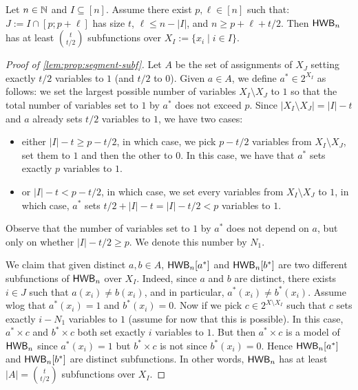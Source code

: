 \documentclass[a4paper,UKenglish,cleveref, autoref, thm-restate]{lipics-v2021}
\begin{document}
\begin{toappendix}
\begin{lemma}
	\label{lem:prop:segment-subf}
	Let $n \in \mathbb{N}$ and $I \subseteq [n]$. Assume there exist $p, \ell \in [n]$ such that:
		 $J := I \cap [p; p+\ell]$ has size $t$,
		 $\ell \leq n - |I|$, and
		 $n \geq p+\ell+t/2$.
	Then $\mathsf{HWB}_n$ has at least $t \choose t/2$ subfunctions over $X_I := \{x_i \mid i \in I\}$.
\end{lemma}
  \begin{proof}[Proof of \cref{lem:prop:segment-subf}]
	Let $A$ be the set of assignments of $X_J$ setting exactly $t/2$ variables to $1$ (and $t/2$ to $0$). Given $a \in A$, we define $a^* \in 2^{X_I}$  as follows: we set the largest possible number of variables $X_I \setminus X_J$ to $1$ so that the total number of variables set to $1$ by $a^*$ does not exceed $p$. Since $|X_I \setminus X_J| = |I|-t$ and $a$ already sets $t/2$ variables to $1$, we have two cases:
	\begin{itemize}
		\item either $|I|-t \geq p-t/2$, in which case, we pick $p-t/2$ variables from $X_I \setminus X_J$, set them to $1$ and then the other to $0$. In this case, we have that $a^*$ sets exactly $p$ variables to $1$.
		\item or $|I|-t < p-t/2$, in which case, we set every variables from $X_I \setminus X_J$ to $1$, in which case, $a^*$ sets $t/2+|I|-t = |I|-t/2<p$ variables to $1$. 
	\end{itemize}
	Observe that the number of variables set to $1$ by $a^*$ does not depend on $a$, but only on whether $|I|-t/2 \geq p$. We denote this number by $N_1$. 
	
	We claim that given distinct $a,b \in A$, $\mathsf{HWB}_n[a^*]$ and $\mathsf{HWB}_n[b^*]$ are two different subfunctions of $\mathsf{HWB}_n$ over $X_I$. Indeed, since $a$ and $b$ are distinct, there exists $i \in J$ such that $a(x_i) \neq b(x_i)$, and in particular, $a^*(x_i) \neq b^*(x_i)$. Assume wlog that $a^*(x_i) = 1$ and $b^*(x_i) = 0$. Now if we pick $c \in 2^{X \setminus X_I}$ such that $c$ sets exactly $i-N_1$ variables to $1$ (assume for now that this is possible). In this case, $a^* \times c$ and $b^* \times c$ both set exactly $i$ variables to $1$. But then $a^* \times c$ is a model of $\mathsf{HWB}_n$ since $a^*(x_i)=1$ but $b^* \times c$ is not since $b^*(x_i)=0$. Hence $\mathsf{HWB}_n[a^*]$ and $\mathsf{HWB}_n[b^*]$ are distinct subfunctions. In other words, $\mathsf{HWB}_n$ has at least $|A| = {t \choose t/2}$ subfunctions over $X_I$.
	

\end{proof}
\end{toappendix}
\end{document}
